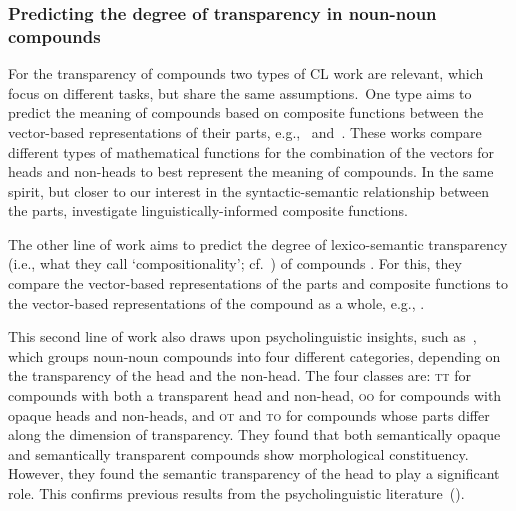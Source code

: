 \documentclass[output=paper]{langsci/langscibook}
\begin{document}
\subsubsection{Predicting  {the degree of transparency in noun-noun} compounds}\label{sec:NLP:lit:compositional}
For the transparency of  compounds two types of CL work are relevant,  {which} focus on different tasks, but share the same assumptions.\ One type  aims to predict the meaning of compounds based on composite functions between the vector-based representations of their parts, e.g.,~\cite{OSeaghdha:2008} and~\cite{Mitchell:2010}.
These works  compare different types of mathematical functions for the combination of the vectors for heads and non-heads to best represent the  meaning of compounds.  {In the same spirit, but closer to our interest in the syntactic-semantic relationship between the parts, \cite{marelli:baroni:15,baroni:zamparelli:10} investigate linguistically-informed composite functions.}

The other line of work aims to predict the degree of  {lexico-semantic transparency}  {(i.e., what they call \lq compositionality\rq; cf.~)} of compounds {. For this, they compare} the vector-based representations of the parts and composite functions  {to} the vector-based representations of the compound as a whole, e.g., \cite{SchulteImWaldeEtAl:16,Reddy:2011}. 

This  second line of work also draws upon psycholinguistic insights,  such as~\citet{Libben:1997,Libben:2003}, which groups noun-noun compounds into four different categories, depending on the transparency of the head and the non-head.
The four classes are:
 {\textsc{tt}} for compounds with both a transparent head and non-head,
 {\textsc{oo}} for compounds with opaque heads and non-heads,
and  {\textsc{ot}} and  {\textsc{to}} for compounds whose parts differ along the dimension of transparency. They found that both semantically opaque and semantically transparent compounds show morphological constituency. However, they found the semantic transparency of the head to play a significant role. This confirms previous results from the psycholinguistic literature~(\cite{Zwitserlood:1994}). 
\end{document}
